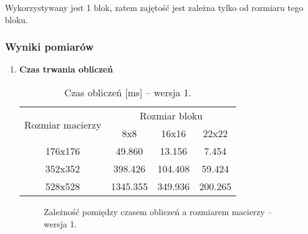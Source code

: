 Wykorzystywany jest 1 blok, zatem zajętość jest zależna tylko od rozmiaru tego bloku. \\

\subsubsection{Wyniki pomiarów}

\begin{enumerate}

\item \textbf{Czas trwania obliczeń} \newline

\begin{table}[H]
\centering
\begin{tabular}{|c|c|c|c|}
\hline
\multirow{2}{*}{Rozmiar macierzy} & \multicolumn{3}{c|}{Rozmiar bloku} \\ \cline{2-4}
& 8x8 & 16x16 & 22x22 \\ \hline
176x176 & 49.860 & 13.156 & 7.454 \\ \hline
352x352 & 398.426 & 104.408 & 59.424 \\ \hline
528x528 & 1345.355 & 349.936 & 200.265 \\ \hline
\end{tabular}
\caption{Czas obliczeń [ms] -- wersja 1.}
\end{table}

\begin{figure}[H]
\centering
\caption{Zależność pomiędzy czasem obliczeń a rozmiarem macierzy -- wersja 1.}
\end{figure}



\end{enumerate}
